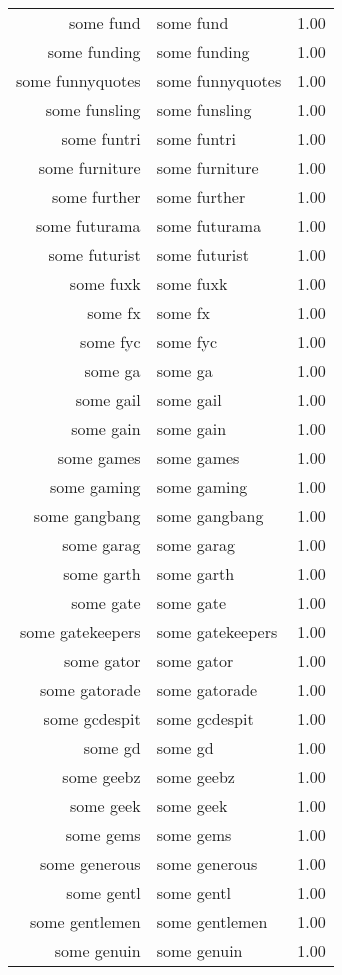\begin{table}[ht]
\begin{tabular}{rlr}
  some fund & some fund & 1.00 \\ 
  some funding & some funding & 1.00 \\ 
  some funnyquotes & some funnyquotes & 1.00 \\ 
  some funsling & some funsling & 1.00 \\ 
  some funtri & some funtri & 1.00 \\ 
  some furniture & some furniture & 1.00 \\ 
  some further & some further & 1.00 \\ 
  some futurama & some futurama & 1.00 \\ 
  some futurist & some futurist & 1.00 \\ 
  some fuxk & some fuxk & 1.00 \\ 
  some fx & some fx & 1.00 \\ 
  some fyc & some fyc & 1.00 \\ 
  some ga & some ga & 1.00 \\ 
  some gail & some gail & 1.00 \\ 
  some gain & some gain & 1.00 \\ 
  some games & some games & 1.00 \\ 
  some gaming & some gaming & 1.00 \\ 
  some gangbang & some gangbang & 1.00 \\ 
  some garag & some garag & 1.00 \\ 
  some garth & some garth & 1.00 \\ 
  some gate & some gate & 1.00 \\ 
  some gatekeepers & some gatekeepers & 1.00 \\ 
  some gator & some gator & 1.00 \\ 
  some gatorade & some gatorade & 1.00 \\ 
  some gcdespit & some gcdespit & 1.00 \\ 
  some gd & some gd & 1.00 \\ 
  some geebz & some geebz & 1.00 \\ 
  some geek & some geek & 1.00 \\ 
  some gems & some gems & 1.00 \\ 
  some generous & some generous & 1.00 \\ 
  some gentl & some gentl & 1.00 \\ 
  some gentlemen & some gentlemen & 1.00 \\ 
  some genuin & some genuin & 1.00 \\ 

\end{tabular}
\end{table}
